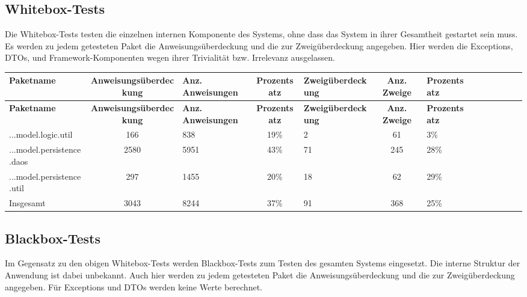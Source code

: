 \documentclass{article}
\begin{document}
\subsection{Whitebox-Tests}

Die Whitebox-Tests testen die einzelnen internen Komponente des Systems, ohne dass das System in ihrer Gesamtheit gestartet sein muss. 
Es werden zu jedem getesteten Paket die Anweisungsüberdeckung und die zur Zweigüberdeckung angegeben. 
Hier werden die Exceptions, DTOs, und Framework-Komponenten wegen ihrer Trivialität bzw. Irrelevanz ausgelassen.

\begin{longtable}{@{}lclclclclclcl@{}}
\toprule
\textbf{Paketname} & \textbf{Anweisungsüberdeckung} & \textbf{Anz. Anweisungen} & \textbf{Prozentsatz} & \textbf{Zweigüberdeckung} & \textbf{Anz. Zweige} & \textbf{Prozentsatz} \\* \midrule
\endfirsthead
\textbf{Paketname} & \textbf{Anweisungsüberdeckung} & \textbf{Anz. Anweisungen} & \textbf{Prozentsatz} & \textbf{Zweigüberdeckung} & \textbf{Anz. Zweige} & \textbf{Prozentsatz} \\* \midrule
\endhead
...model.logic.util 			& 166 		& 838 		& 19\% 		& 2 			& 61 			& 3\% \\
...model.persistence.daos 		& 2580 		& 5951 		& 43\% 		& 71 			& 245 		& 28\% \\
...model.persistence.util 		& 297 		& 1455 		& 20\% 		& 18 			& 62 			& 29\% \\
Insgesamt 						& 3043 		& 8244 		& 37\% 		& 91 			& 368 		& 25\% \\* \bottomrule
\end{longtable}

\subsection{Blackbox-Tests}

Im Gegensatz zu den obigen Whitebox-Tests werden Blackbox-Tests zum Testen des gesamten Systems eingesetzt. Die interne Struktur der Anwendung ist dabei unbekannt. 
Auch hier werden zu jedem getesteten Paket die Anweisungsüberdeckung und die zur Zweigüberdeckung angegeben. 
Für Exceptions und DTOs werden keine Werte berechnet.
\end{document}
